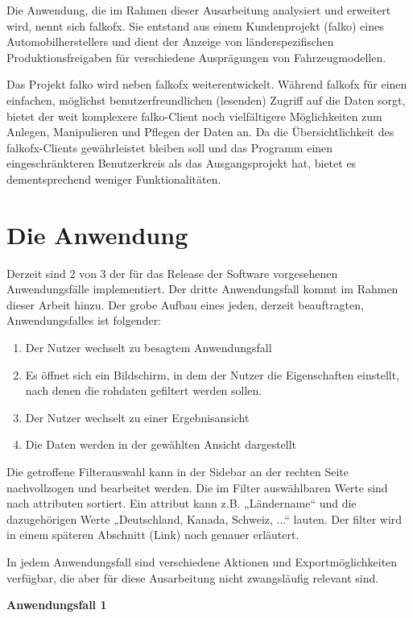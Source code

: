 Die Anwendung, die im Rahmen dieser Ausarbeitung analysiert und erweitert wird, nennt sich \gls{falkofx}. Sie entstand aus einem Kundenprojekt (\gls{falko}) eines Automobilherstellers und dient der Anzeige von länderspezifischen Produktionsfreigaben für verschiedene Ausprägungen von Fahrzeugmodellen.

Das Projekt \gls{falko} wird neben \gls{falkofx} weiterentwickelt. Während \gls{falkofx} für einen einfachen, möglichst benutzerfreundlichen (lesenden) Zugriff auf die Daten sorgt, bietet der weit komplexere \gls{falko}-Client noch vielfältigere Möglichkeiten zum Anlegen, Manipulieren und Pflegen der Daten an. Da die Übersichtlichkeit des \gls{falkofx}-Clients gewährleistet bleiben soll und das Programm einen eingeschränkteren Benutzerkreis als das Ausgangsprojekt hat, bietet es dementsprechend weniger Funktionalitäten.
\section{Die Anwendung} \label{sec:grundAnwendung}
Derzeit sind 2 von 3 der für das Release der Software vorgesehenen Anwendungsfälle implementiert. Der dritte Anwendungsfall kommt im Rahmen dieser Arbeit hinzu. Der grobe Aufbau eines jeden, derzeit beauftragten, Anwendungsfalles ist folgender:
\begin{enumerate}
	\item Der Nutzer wechselt zu besagtem Anwendungsfall
	\item Es öffnet sich ein Bildschirm, in dem der Nutzer die Eigenschaften einstellt, nach denen die \gls{rohdaten} gefiltert werden sollen.
	\item Der Nutzer wechselt zu einer Ergebnisansicht
	\item Die Daten werden in der gewählten Ansicht dargestellt
\end{enumerate}

Die getroffene Filterauswahl kann in der Sidebar an der rechten Seite nachvollzogen und bearbeitet werden. Die im Filter auswählbaren Werte sind nach \gls{attribut}en sortiert. Ein \gls{attribut} kann z.B. „Ländername“ und die dazugehörigen Werte „Deutschland, Kanada, Schweiz, ...“ lauten. Der \gls{filter} wird in einem späteren Abschnitt (Link) noch genauer erläutert.

In jedem Anwendungsfall sind verschiedene Aktionen und Exportmöglichkeiten verfügbar, die aber für diese Ausarbeitung nicht zwangsläufig relevant sind.

\textbf{Anwendungsfall 1}

